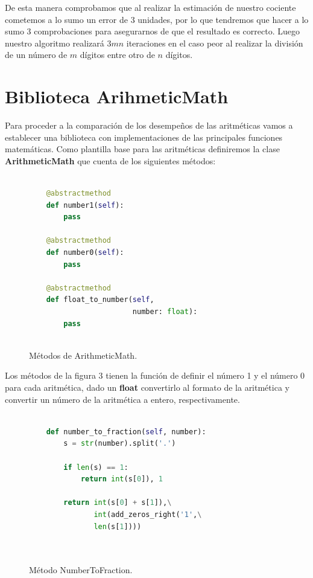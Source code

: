 \documentclass[a4paper,10pt,twocolumn]{article}
\begin{document}
	De esta manera comprobamos que al realizar la estimación de nuestro cociente cometemos a lo sumo un error de 3 unidades, por lo que tendremos que hacer a lo sumo 3 comprobaciones para asegurarnos de que el resultado es correcto. Luego nuestro algoritmo realizará $3mn$ iteraciones en el caso peor al realizar la división de un número de $m$ dígitos entre otro de $n$ dígitos. 
	
\section{Biblioteca ArihmeticMath}\label{suc:arithmetic_math}
	Para proceder a la comparación de los desempeños de las aritméticas vamos a establecer una biblioteca con implementaciones de las principales funciones matemáticas. Como plantilla base para las aritméticas definiremos la clase \textbf{ArithmeticMath} que cuenta de los siguientes métodos:
	

		\begin{figure}[htb]%
			\begin{lstlisting}[language=python]%

    @abstractmethod
    def number1(self):
        pass

    @abstractmethod
    def number0(self):
        pass
        
    @abstractmethod
    def float_to_number(self, 
                        number: float):
        pass
		
		\end{lstlisting}
		\caption{Métodos de ArithmeticMath.\label{fig:code}}
		\end{figure}
	
	Los métodos de la figura 3 tienen la función de definir el número 1 y el número 0 para cada aritmética, dado un \textbf{float} convertirlo al formato de la aritmética y convertir un número de la aritmética a entero, respectivamente.
	
	\begin{figure}[htb]%
			\begin{lstlisting}[language=python]%

    def number_to_fraction(self, number):
        s = str(number).split('.')

        if len(s) == 1:
            return int(s[0]), 1

        return int(s[0] + s[1]),\
               int(add_zeros_right('1',\
               len(s[1])))

		
		\end{lstlisting}
		\caption{Método NumberToFraction.\label{fig:code}}
		\end{figure}
		
\end{document}
